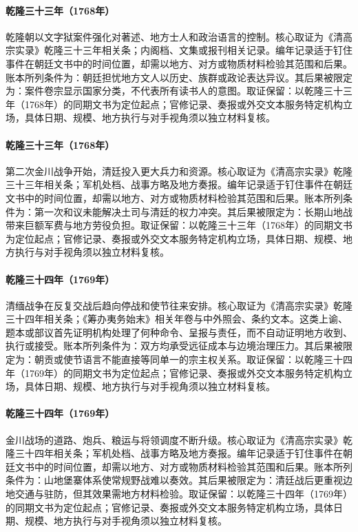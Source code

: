 \hypertarget{ledger:EQ-1768-LITERARY-INQUISITION}{}\paragraph{乾隆三十三年（1768年）}乾隆朝以文字狱案件强化对著述、地方士人和政治语言的控制。核心取证为《清高宗实录》乾隆三十三年相关条；内阁档、文集或报刊相关记录。编年记录适于钉住事件在朝廷文书中的时间位置，却需以地方、对方或物质材料检验其范围和后果。账本所列条件为：朝廷担忧地方文人以历史、族群或政论表达异议。其后果被限定为：案件卷宗显示国家分类，不代表所有读书人的意图。取证保留：以乾隆三十三年（1768年）的同期文书为定位起点；官修记录、奏报或外交文本服务特定机构立场，具体日期、规模、地方执行与对手视角须以独立材料复核。
\hypertarget{ledger:EQ-1768-SECOND-JINCHUAN-WAR}{}\paragraph{乾隆三十三年（1768年）}第二次金川战争开始，清廷投入更大兵力和资源。核心取证为《清高宗实录》乾隆三十三年相关条；军机处档、战事方略及地方奏报。编年记录适于钉住事件在朝廷文书中的时间位置，却需以地方、对方或物质材料检验其范围和后果。账本所列条件为：第一次和议未能解决土司与清廷的权力冲突。其后果被限定为：长期山地战带来巨额军费与地方劳役负担。取证保留：以乾隆三十三年（1768年）的同期文书为定位起点；官修记录、奏报或外交文本服务特定机构立场，具体日期、规模、地方执行与对手视角须以独立材料复核。
\hypertarget{ledger:EQ-1769-BURMA-SETTLEMENT}{}\paragraph{乾隆三十四年（1769年）}清缅战争在反复交战后趋向停战和使节往来安排。核心取证为《清高宗实录》乾隆三十四年相关条；《筹办夷务始末》相关年卷与中外照会、条约文本。这类上谕、题本或部议首先证明机构处理了何种命令、呈报与责任，而不自动证明地方收到、执行或接受。账本所列条件为：双方均承受远征成本与边境治理压力。其后果被限定为：朝贡或使节语言不能直接等同单一的宗主权关系。取证保留：以乾隆三十四年（1769年）的同期文书为定位起点；官修记录、奏报或外交文本服务特定机构立场，具体日期、规模、地方执行与对手视角须以独立材料复核。
\hypertarget{ledger:EQ-1769-JINCHUAN-ESCALATION}{}\paragraph{乾隆三十四年（1769年）}金川战场的道路、炮兵、粮运与将领调度不断升级。核心取证为《清高宗实录》乾隆三十四年相关条；军机处档、战事方略及地方奏报。编年记录适于钉住事件在朝廷文书中的时间位置，却需以地方、对方或物质材料检验其范围和后果。账本所列条件为：山地堡寨体系使常规野战难以奏效。其后果被限定为：清廷战后更重视边地交通与驻防，但其效果需地方材料检验。取证保留：以乾隆三十四年（1769年）的同期文书为定位起点；官修记录、奏报或外交文本服务特定机构立场，具体日期、规模、地方执行与对手视角须以独立材料复核。
